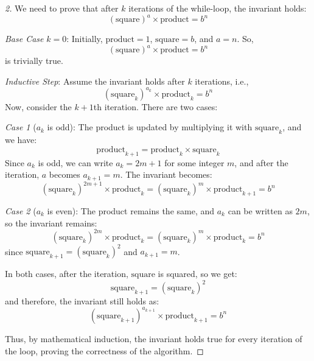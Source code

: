 \begin{proof}[2]
    We need to prove that after \(k\) iterations of the while-loop, the invariant holds:
\[
(\text{square})^a \times \text{product} = b^n
\]

\textit{Base Case} \(k=0\):
Initially, \(\text{product} = 1\), \(\text{square} = b\), and \(a = n\). So,
\[
(\text{square})^a \times \text{product} = b^n
\]
is trivially true.

\textit{Inductive Step}:
Assume the invariant holds after \(k\) iterations, i.e.,
\[
(\text{square}_k)^{a_k} \times \text{product}_k = b^n
\]
Now, consider the \(k+1\)th iteration. There are two cases:

\textit{Case 1} (\(a_k\) is odd):
The product is updated by multiplying it with \(\text{square}_k\), and we have:
\[
\text{product}_{k+1} = \text{product}_k \times \text{square}_k
\]
Since \(a_k\) is odd, we can write \(a_k = 2m + 1\) for some integer \(m\), and after the iteration, \(a\) becomes \(a_{k+1} = m\). The invariant becomes:
\[
(\text{square}_k)^{2m+1} \times \text{product}_k = (\text{square}_k)^m \times \text{product}_{k+1} = b^n
\]

\textit{Case 2} (\(a_k\) is even):
The product remains the same, and \(a_k\) can be written as \(2m\), so the invariant remains:
\[
(\text{square}_k)^{2m} \times \text{product}_k = (\text{square}_k)^m \times \text{product}_k = b^n
\]
since \(\text{square}_{k+1} = (\text{square}_k)^2\) and \(a_{k+1} = m\).

In both cases, after the iteration, \(\text{square}\) is squared, so we get:
\[
\text{square}_{k+1} = (\text{square}_k)^2
\]
and therefore, the invariant still holds as:
\[
(\text{square}_{k+1})^{a_{k+1}} \times \text{product}_{k+1} = b^n
\]

Thus, by mathematical induction, the invariant holds true for every iteration of the loop, proving the correctness of the algorithm.
\end{proof}

